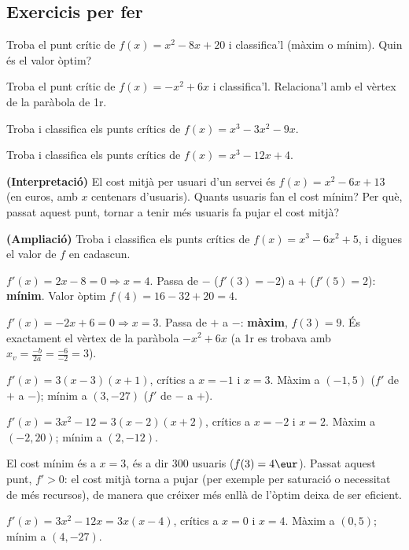 \subsection{Exercicis per fer}

\begin{exercicis}
\begin{exlist}
  \item Troba el punt crític de $f(x)=x^2-8x+20$ i classifica'l (màxim o mínim).
        Quin és el valor òptim?
  \item Troba el punt crític de $f(x)=-x^2+6x$ i classifica'l. Relaciona'l amb el
        vèrtex de la paràbola de 1r.
  \item Troba i classifica els punts crítics de $f(x)=x^3-3x^2-9x$.
  \item Troba i classifica els punts crítics de $f(x)=x^3-12x+4$.
  \item \textbf{(Interpretació)} El cost mitjà per usuari d'un servei és
        $f(x)=x^2-6x+13$ (en euros, amb $x$ centenars d'usuaris). Quants usuaris fan el
        cost mínim? Per què, passat aquest punt, tornar a tenir més usuaris fa pujar el
        cost mitjà?
  \item \textbf{(Ampliació)} Troba i classifica els punts crítics de
        $f(x)=x^3-6x^2+5$, i digues el valor de $f$ en cadascun.
\end{exlist}
\end{exercicis}

\begin{solucions}
\begin{sollist}
  \item $f'(x)=2x-8=0\Rightarrow x=4$. Passa de $-$ ($f'(3)=-2$) a $+$ ($f'(5)=2$):
        \textbf{mínim}. Valor òptim $f(4)=16-32+20=4$.
  \item $f'(x)=-2x+6=0\Rightarrow x=3$. Passa de $+$ a $-$: \textbf{màxim}, $f(3)=9$. És
        exactament el vèrtex de la paràbola $-x^2+6x$ (a 1r es trobava amb
        $x_v=\frac{-b}{2a}=\frac{-6}{-2}=3$).
  \item $f'(x)=3(x-3)(x+1)$, crítics a $x=-1$ i $x=3$. Màxim a $(-1,5)$
        ($f'$ de $+$ a $-$); mínim a $(3,-27)$ ($f'$ de $-$ a $+$).
  \item $f'(x)=3x^2-12=3(x-2)(x+2)$, crítics a $x=-2$ i $x=2$. Màxim a $(-2,20)$;
        mínim a $(2,-12)$.
  \item El cost mínim és a $x=3$, és a dir $300$ usuaris ($f(3)=4\eur$). Passat aquest
        punt, $f'>0$: el cost mitjà torna a pujar (per exemple per saturació o necessitat
        de més recursos), de manera que créixer més enllà de l'òptim deixa de ser
        eficient.
  \item $f'(x)=3x^2-12x=3x(x-4)$, crítics a $x=0$ i $x=4$. Màxim a $(0,5)$; mínim a
        $(4,-27)$.
\end{sollist}
\end{solucions}
